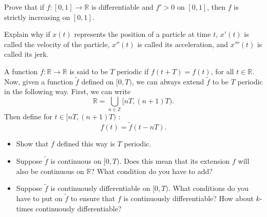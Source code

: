   \begin{exercise}
    Prove that if $f : [0, 1] \to \mathbb{R}$ is differentiable and $f' > 0$ on $[0, 1]$, then $f$ is strictly increasing on $[0, 1]$.
  \end{exercise}
  \begin{solution}

  \end{solution}

  \begin{exercise}
    Explain why if $x(t)$ represents the position of a particle at time $t$, $x'(t)$ is called the velocity of the particle, $x''(t)$ is called its acceleration, and $x'''(t)$ is called its jerk.
  \end{exercise}
  \begin{solution}

  \end{solution}

  \begin{exercise}
    A function $f : \mathbb{R} \to \mathbb{R}$ is said to be $T$ periodic if $f(t + T) = f(t)$, for all $t \in \mathbb{R}$. Now, given a function $\tilde{f}$ defined on $[0, T)$, we can always extend $\tilde{f}$ to be $T$ periodic in the following way. First, we can write
    \begin{equation}
      \mathbb{R} = \bigcup_{n\in\mathbb{Z}} [nT,(n + 1)T).
    \end{equation}
    Then define for $t \in [nT,(n + 1)T)$ :
    \begin{equation}
      f(t) = \tilde{f}(t - nT).
    \end{equation}
    
    \begin{itemize}
      \item Show that $f$ defined this way is $T$ periodic.
      \item Suppose $\tilde{f}$ is continuous on $[0, T)$. Does this mean that its extension $f$ will also be continuous on $\mathbb{R}$? What condition do you have to add?
      \item Suppose $\tilde{f}$ is continuously differentiable on $[0, T)$. What conditions do you have to put on $\tilde{f}$ to ensure that $f$ is continuously differentiable? How about $k$-times continuously differentiable?
    \end{itemize}
  \end{exercise}
  \begin{solution}

  \end{solution}

